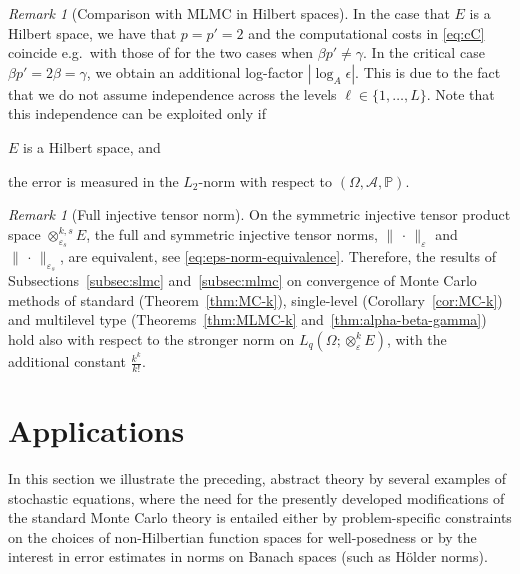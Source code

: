 \documentclass[reqno]{amsart}
\numberwithin{equation}{section}
\newcommand{\bbP}{\mathbb{P}}
\newcommand{\cA}{\mathcal{A}}
\newcommand{\xkeps}{\otimes^k_\varepsilon}
\newcommand{\xkseps}{\otimes^{k,s}_{\varepsilon_s}}
\newcommand{\norm}[2]{     \| #1       \|_{ #2 }}
\newcommand{\eps}{\varepsilon}
\theoremstyle{remark}
\newtheorem{remark}[lemma]{Remark}
\theoremstyle{definition}
\begin{document}
\begin{remark}[Comparison with MLMC in Hilbert spaces]
	In the case that $E$ is a Hilbert space, 
	we have that $p=p'=2$ and the computational 
	costs in \eqref{eq:cC} coincide e.g.\ with those 
	of \cite[Theorem~1]{CliffeGilesScheichlTeckentrup2011} 
	for the two cases when $\beta p'\neq \gamma$. 
	In the critical case $\beta p' = 2\beta =\gamma$, 
	we obtain an additional log-factor $|\log_A \epsilon|$. 
	This is due to the fact that 
	we do not assume independence 
	across the levels $\ell\in\{1,\ldots,L\}$. 
	Note that this independence 
	can be exploited only if 
	\begin{enumerate*}[label=(\roman*)] 
		\item 
		$E$ is a  Hilbert space, 
		and 
		\item the error is measured 
		in the $L_2$-norm with respect to 
		$(\Omega,\cA,\bbP)$. 
	\end{enumerate*}
\end{remark} 

\begin{remark}[Full injective tensor norm]
	On the symmetric injective tensor product 
	space $\xkseps E$, 
	the full and symmetric injective tensor norms, 
	$\norm{\,\cdot\,}{\eps}$ 
	and 
	$\norm{\,\cdot\,}{\eps_s}$, 
	are equivalent,  
	see \eqref{eq:eps-norm-equivalence}. 
	Therefore, 
	the results 
	of Subsections~\ref{subsec:slmc} 
	and~\ref{subsec:mlmc} 
	on convergence of Monte Carlo methods 
	of standard (Theorem~\ref{thm:MC-k}), 
	single-level (Corollary~\ref{cor:MC-k}) 
	and multilevel type (Theorems~\ref{thm:MLMC-k} 
	and~\ref{thm:alpha-beta-gamma}) 
	hold also with respect to  
	the stronger norm on 
	$L_q(\Omega;\xkeps E)$, 
	with the additional constant $\tfrac{k^k}{k!}$. 
\end{remark} 

\section{Applications} 
\label{section:applications}   

In this section 
we illustrate the preceding, abstract theory by several
examples of stochastic equations, 
where the need for the presently
developed modifications of the standard 
Monte Carlo theory 
is entailed either 
by problem-specific constraints on the choices of 
non-Hilbertian function spaces for well-posedness 
or by the interest in error estimates  
in norms on Banach spaces (such as H\"older norms). 
\end{document}
